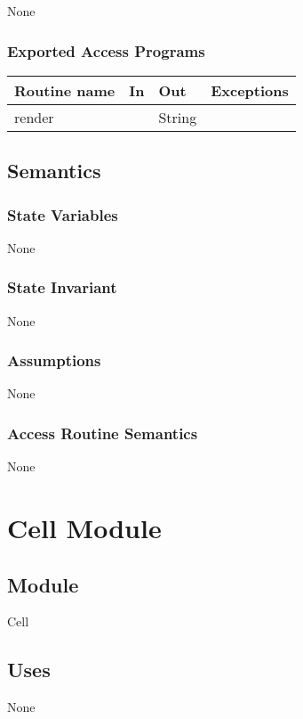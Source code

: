 \documentclass[12pt]{article}
\begin{document}
None

\subsubsection* {Exported Access Programs}

\begin{tabular}{| l | l | l | p{5cm} |}
\hline
\textbf{Routine name} & \textbf{In} & \textbf{Out} & \textbf{Exceptions}\\
\hline
render &   & String & \\
\hline
\end{tabular}

\subsection* {Semantics}

\subsubsection* {State Variables}

None

\subsubsection* {State Invariant}

None

\subsubsection* {Assumptions}

None

\subsubsection* {Access Routine Semantics}

None

\newpage

%

\section*{Cell Module}
\subsection* {Module}
Cell
\subsection* {Uses}
None
\end{document}

